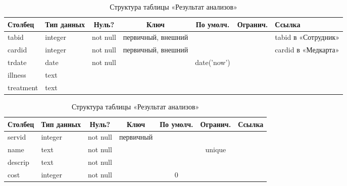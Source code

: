 \documentclass[14pt,a4paper,russian]{extreport}
\begin{document}
\begin{table}[h!]
    \caption{ } 
    \begin{subtable}[t]{\textwidth}
    \caption{Структура таблицы «Результат анализов»}
    \begin{tabularx}{\textwidth}{| X | X | c | c | c | c | X |}
        \hline
        \textbf{Столбец} & \textbf{Тип данных} & \textbf{Нуль?} & \textbf{Ключ} & \textbf{По
        умолч.} & \textbf{Огранич.} & \textbf{Ссылка} \\ \hline
        tabid & integer & not null & первичный, внешний & & & tabid в «Сотрудник» \\ \hline
        cardid & integer & not null & первичный, внешний & & & cardid в «Медкарта» \\ \hline
        trdate & date & not null & & date('now') & & \\ \hline 
        illness & text & & & & & \\ \hline
        treatment & text & & & & & \\ \hline
    \end{tabularx}
    \end{subtable}
    \label{table:treat}
\end{table}

\begin{table}[h!]
    \caption{ } 
    \begin{subtable}[t]{\textwidth}
    \caption{Структура таблицы «Результат анализов»}
    \begin{tabularx}{\textwidth}{| X | X | c | c | c | c | X |}
        \hline
        \textbf{Столбец} & \textbf{Тип данных} & \textbf{Нуль?} & \textbf{Ключ} & \textbf{По
        умолч.} & \textbf{Огранич.} & \textbf{Ссылка} \\ \hline
        servid & integer & not null & первичный & & & \\ \hline
        name & text & not null & & & unique & \\ \hline
        descrip & text & not null & & & & \\ \hline
        cost & integer & not null & & 0 & & \\ \hline
    \end{tabularx}
    \end{subtable}
    \label{table:serv}
\end{table}
\end{document}
